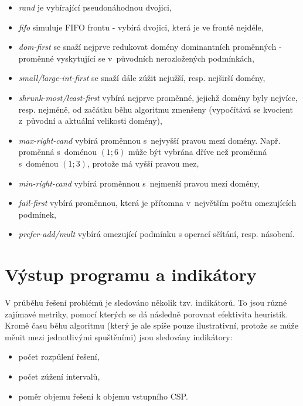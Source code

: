 \begin{itemize}
  \item \emph{rand} je  vybírající pseudonáhodnou dvojici,
  \item \emph{fifo} simuluje FIFO frontu - vybírá dvojici, která je ve frontě nejdéle,
  \item \emph{dom-first} \cite{feiten10} se snaží nejprve redukovat domény dominantních proměnných - proměnné vyskytující se v~původních nerozložených podmínkách,
  \item \emph{small/large-int-first} \cite{feiten10} se snaží dále zúžit nejužší, resp. nejširší domény,
  \item \emph{shrunk-most/least-first} \cite{feiten10} vybírá nejprve proměnné, jejichž domény byly nejvíce, resp. nejméně, od začátku běhu algoritmu zmenšeny (vypočítává se kvocient z~původní a aktuální velikosti domény),
  \item \emph{max-right-cand} \cite{feiten10} vybírá proměnnou s~nejvyšší pravou mezí domény. Např. proměnná s~doménou $(1;6)$ může být vybrána dříve než proměnná s~doménou $(1;3)$, protože má vyšší pravou mez,
  \item \emph{min-right-cand} \cite{feiten10} vybírá proměnnou s~nejmenší pravou mezí domény,
  \item \emph{fail-first} vybírá proměnnou, která je přítomna v~největším počtu omezujících podmínek,
  \item \emph{prefer-add/mult} vybírá omezující podmínku s operací sčítání, resp. násobení.
\end{itemize}

\section{Výstup programu a indikátory}
\label{ch:indicators}
V průběhu řešení problémů je sledováno několik tzv. indikátorů. To jsou různé zajímavé metriky, pomocí kterých se dá následně porovnat efektivita heuristik. Kromě času běhu algoritmu (který je ale spíše pouze ilustrativní, protože se může měnit mezi jednotlivými spuštěními) jsou sledovány indikátory:

\begin{itemize}
    \item počet rozpůlení řešení,
    \item počet zúžení intervalů,
    \item poměr objemu řešení k objemu vstupního CSP.
\end{itemize}





